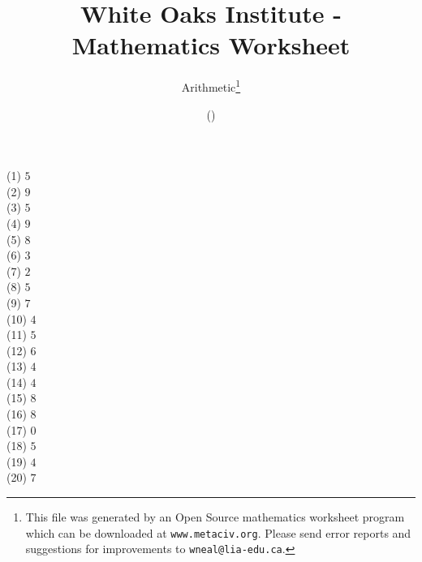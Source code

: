 \documentclass[letter]{article}
\begin{document}
\title{White Oaks Institute - Mathematics Worksheet}
\author{Arithmetic\thanks{This file was generated by an \textsf{Open Source} mathematics worksheet program which can be downloaded at \texttt{www.metaciv.org}. Please send error reports and suggestions for improvements to \texttt{wneal@lia-edu.ca}.}}
\date{\XCfileversion{} (\XCfiledate)}
\maketitle
\begin{multicols}{2}(1) $5$\\(2) $9$\\(3) $5$\\(4) $9$\\(5) $8$\\(6) $3$\\(7) $2$\\(8) $5$\\(9) $7$\\(10) $4$\\(11) $5$\\(12) $6$\\(13) $4$\\(14) $4$\\(15) $8$\\(16) $8$\\(17) $0$\\(18) $5$\\(19) $4$\\(20) $7$\end{multicols}
\end{document}
